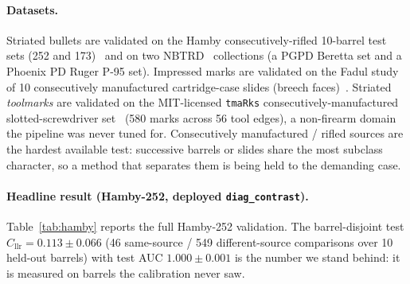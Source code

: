 \documentclass[11pt]{article}
\newcommand{\Cllr}{C_{\mathrm{llr}}}
\newcommand{\diagcontrast}{\texttt{diag\_contrast}}
\newcommand{\code}[1]{\texttt{#1}}
\begin{document}
\paragraph{Datasets.} Striated bullets are validated on the Hamby
consecutively-rifled 10-barrel test sets (252 and 173)~\cite{hamby2009} and on two
NBTRD~\cite{nbtrd2020} collections (a PGPD Beretta set and a Phoenix PD Ruger
P-95 set). Impressed marks are validated on the Fadul study of 10 consecutively
manufactured cartridge-case slides (breech faces)~\cite{fadul2011}. Striated
\emph{toolmarks} are validated on the MIT-licensed \code{tmaRks}
consecutively-manufactured slotted-screwdriver set~\cite{tmarks} (580 marks across
56 tool edges), a non-firearm domain the pipeline was never tuned for. Consecutively
manufactured / rifled sources are the hardest available test: successive barrels or
slides share the most subclass character, so a method that separates them is being
held to the demanding case.

\paragraph{Headline result (Hamby-252, deployed \diagcontrast).}
Table~\ref{tab:hamby} reports the full Hamby-252 validation. The barrel-disjoint
test $\Cllr = \num{0.113}\pm\num{0.066}$ (46 same-source / 549 different-source
comparisons over 10 held-out barrels) with test AUC $\num{1.000}\pm\num{0.001}$ is
the number we stand behind: it is measured on barrels the calibration never saw.
\end{document}
